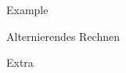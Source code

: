 \documentclass{exsheetans}
\author{Author Name} %
\begin{document}
\begin{quiz}
	\item %
\end{quiz}
\begin{answer}[8]{Example}
\end{answer}

\begin{answer}[7]{Alternierendes Rechnen}
	\begin{subanswer}
	\end{subanswer}
	\begin{subanswer}
	\end{subanswer}
\end{answer}
\begin{supplement}[10]{Extra}
\end{supplement}
\end{document}
